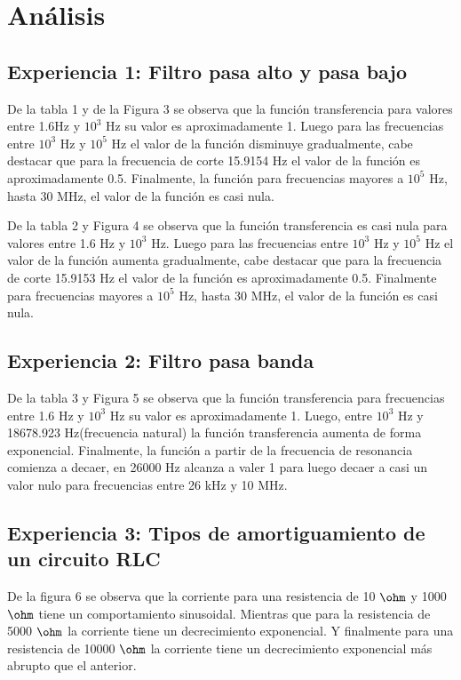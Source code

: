 \documentclass[letterpaper,11pt]{article} %
\begin{document}
\newpage
\section{Análisis}
\subsection{Experiencia 1: Filtro pasa alto y pasa bajo}
De la tabla 1 y de la Figura 3 se observa que
la función transferencia para valores entre 
1.6Hz y $10^3$ Hz
su valor es aproximadamente 1. Luego para 
las frecuencias entre $10^3$ Hz y $10^5$ Hz
el valor de la función disminuye gradualmente, cabe 
destacar que para la frecuencia de corte 
15.9154 Hz el valor de la
función es aproximadamente 0.5. Finalmente, 
la función para frecuencias mayores a $10^5$ Hz, hasta 30 MHz, 
el valor de la función es casi nula.

De la tabla 2 y Figura 4 se observa que la 
función transferencia es casi nula para valores
entre 1.6 Hz y $10^3$ Hz. Luego para las frecuencias
entre $10^3$ Hz y $10^5$ Hz el valor de la función
aumenta gradualmente, cabe destacar
que para la frecuencia de corte
15.9153 Hz el valor de la función
es aproximadamente 0.5. Finalmente para frecuencias
mayores a $10^5$ Hz, hasta 30 MHz, el valor de la función es casi nula.




\subsection{Experiencia 2: Filtro pasa banda}

De la tabla 3 y Figura 5 se observa que la 
función transferencia para frecuencias 
entre 1.6 Hz y $10^3$ Hz su valor es 
aproximadamente 1. Luego, entre $10^3$ Hz y 
18678.923 Hz(frecuencia natural) la función 
transferencia aumenta de forma exponencial. Finalmente, 
la función a partir de la frecuencia
de resonancia comienza a decaer, en 26000 Hz alcanza a
valer 1 para luego decaer a casi un valor nulo para 
frecuencias entre 26 kHz y 10 MHz.



\subsection{Experiencia 3: Tipos de amortiguamiento de un circuito RLC}

De la figura 6 se observa que la corriente para una
resistencia de 10 $\ohm$ y 1000 $\ohm$  tiene
un comportamiento sinusoidal. Mientras que para
la resistencia
de 5000 $\ohm$ la corriente tiene un decrecimiento exponencial. Y finalmente para una resistencia de 10000 $\ohm$
la corriente tiene un decrecimiento exponencial más abrupto que el anterior. 
\end{document}
